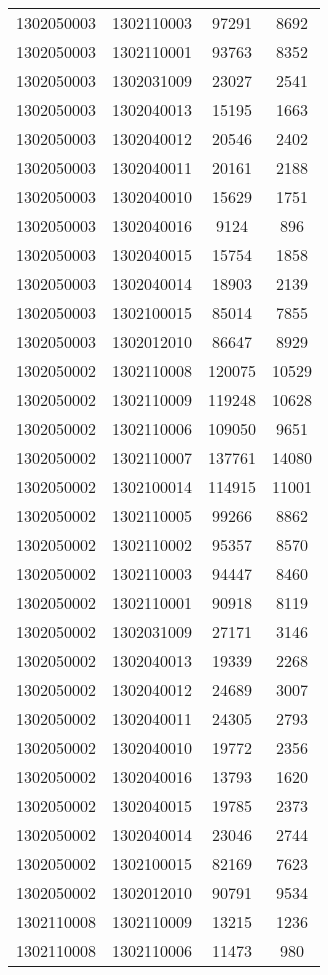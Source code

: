 \begin{longtable}{llcc}
1302050003 & 1302110003 & 97291 & 8692\\
1302050003 & 1302110001 & 93763 & 8352\\
1302050003 & 1302031009 & 23027 & 2541\\
1302050003 & 1302040013 & 15195 & 1663\\
1302050003 & 1302040012 & 20546 & 2402\\
1302050003 & 1302040011 & 20161 & 2188\\
1302050003 & 1302040010 & 15629 & 1751\\
1302050003 & 1302040016 & 9124 & 896\\
1302050003 & 1302040015 & 15754 & 1858\\
1302050003 & 1302040014 & 18903 & 2139\\
1302050003 & 1302100015 & 85014 & 7855\\
1302050003 & 1302012010 & 86647 & 8929\\
1302050002 & 1302110008 & 120075 & 10529\\
1302050002 & 1302110009 & 119248 & 10628\\
1302050002 & 1302110006 & 109050 & 9651\\
1302050002 & 1302110007 & 137761 & 14080\\
1302050002 & 1302100014 & 114915 & 11001\\
1302050002 & 1302110005 & 99266 & 8862\\
1302050002 & 1302110002 & 95357 & 8570\\
1302050002 & 1302110003 & 94447 & 8460\\
1302050002 & 1302110001 & 90918 & 8119\\
1302050002 & 1302031009 & 27171 & 3146\\
1302050002 & 1302040013 & 19339 & 2268\\
1302050002 & 1302040012 & 24689 & 3007\\
1302050002 & 1302040011 & 24305 & 2793\\
1302050002 & 1302040010 & 19772 & 2356\\
1302050002 & 1302040016 & 13793 & 1620\\
1302050002 & 1302040015 & 19785 & 2373\\
1302050002 & 1302040014 & 23046 & 2744\\
1302050002 & 1302100015 & 82169 & 7623\\
1302050002 & 1302012010 & 90791 & 9534\\
1302110008 & 1302110009 & 13215 & 1236\\
1302110008 & 1302110006 & 11473 & 980\\

\end{longtable}
